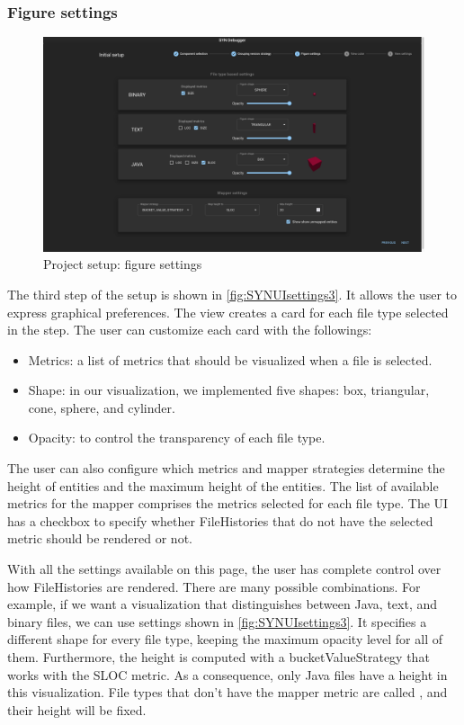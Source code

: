 \subsubsection{Figure settings}

\begin{figure}[h]
    \center
    \includegraphics[width=\textwidth]{SYNUI-settings3.png}
    \caption{Project setup: figure settings}
    \label{fig:SYNUIsettings3}
\end{figure}

The third step of the setup is shown in \autoref{fig:SYNUIsettings3}. It allows the user to express graphical preferences. 
The view creates a card for each file type selected in the  step.
The user can customize each card with the followings:
\begin{itemize}
    \item Metrics: a list of metrics that should be visualized when a file is selected. 
    \item Shape: in our visualization, we implemented five shapes: box, triangular, cone, sphere, and cylinder. 
    \item Opacity: to control the transparency of each file type.
\end{itemize}

The user can also configure which metrics and mapper strategies determine the height of entities and the maximum height of the entities. 
The list of available metrics for the mapper comprises the metrics selected for each file type.
The UI has a checkbox to specify whether FileHistories that do not have the selected metric should be rendered or not. 

With all the settings available on this page, the user has complete control over how FileHistories are rendered. 
There are many possible combinations. For example, if we want a visualization that distinguishes between Java, text, and binary files, we can use settings shown in \autoref{fig:SYNUIsettings3}. It specifies a different shape for every file type, keeping the maximum opacity level for all of them. Furthermore, the height is computed with a bucketValueStrategy that works with the SLOC metric. As a consequence, only Java files have a height in this visualization. File types that don't have the mapper metric are called , and their height will be fixed. 

